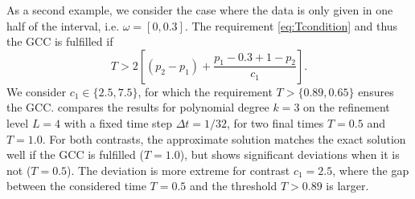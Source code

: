\documentclass[sn-mathphys-num]{sn-jnl}
\numberwithin{equation}{section}
\begin{document}
As a second example, we consider the case where the data is only given in one half of the interval, i.e. $\omega = [0,0.3]$. The requirement \eqref{eq:Tcondition} and thus the GCC is fulfilled if 
\begin{equation}
    T > 2 \left[ (p_2 - p_1) + \frac{p_1 - 0.3 + 1 - p_2}{c_1} \right]. 
\end{equation}
We consider $c_1 \in \{ 2.5, 7.5\}$, for which the requirement $T > \{ 0.89,0.65 \}$ ensures the GCC.  compares the results for polynomial degree $k = 3$ on the refinement level $L = 4$ with a fixed time step $\Delta t = 1/32$, for two final times $T = 0.5$ and $T = 1.0$. For both contrasts, the approximate solution matches the exact solution well if the GCC is fulfilled ($T = 1.0$), but shows significant deviations when it is not ($T = 0.5$). 
The deviation is more extreme for contrast $c_1 = 2.5$, where the gap between the considered time $T = 0.5$ and the threshold $T > 0.89$ is larger. 
\end{document}
